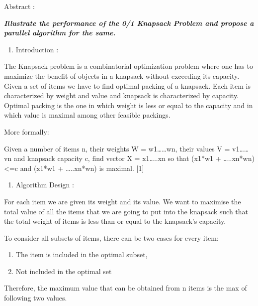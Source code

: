 \documentclass[letterpaper]{article}
\newcounter{saveenum}
\newcommand\liststyleWWNumiii{%
\renewcommand\theenumi{\Roman{enumi}}
\renewcommand\theenumii{\Alph{enumii}}
\renewcommand\theenumiii{\arabic{enumiii}}
\renewcommand\theenumiv{\alph{enumiv}}
\renewcommand\labelenumi{\theenumi.}
\renewcommand\labelenumii{\theenumii.}
\renewcommand\labelenumiii{\theenumiii.}
\renewcommand\labelenumiv{\theenumiv)}
}
\newcommand\liststyleWWNumi{%
\renewcommand\theenumi{\arabic{enumi}}
\renewcommand\theenumii{\alph{enumii}}
\renewcommand\theenumiii{\roman{enumiii}}
\renewcommand\theenumiv{\arabic{enumiv}}
\renewcommand\labelenumi{\theenumi.}
\renewcommand\labelenumii{\theenumii.}
\renewcommand\labelenumiii{\theenumiii.}
\renewcommand\labelenumiv{\theenumiv.}
}
\begin{document}
\begin{multicols}{2}
{\mdseries
Abstract :}

{\bfseries\itshape
Illustrate the performance of the 0/1 Knapsack Problem and propose a parallel algorithm for the same. }

\liststyleWWNumiii
\begin{enumerate}
\item Introduction :
\end{enumerate}
The Knapsack problem is a combinatorial optimization problem where one has to maximize the benefit of objects in a
knapsack without exceeding its capacity. Given a set of items we have to find optimal packing of a knapsack. Each item
is characterized by weight and value and knapsack is characterized by capacity. Optimal packing is the one in which
weight is less or equal to the capacity and in which value is maximal among other feasible packings. 

More formally: 

Given a number of items n, their weights W = w1{\dots}{\dots}wn, their values V = v1{\dots}{\dots}vn and knapsack
capacity c, find vector X = x1{\dots}..xn so that (x1*w1 + {\dots}..xn*wn) {\textless}=c and (x1*w1 + {\dots}..xn*wn)
is maximal. [1] 


\bigskip

\liststyleWWNumiii
\setcounter{saveenum}{\value{enumi}}
\begin{enumerate}
\setcounter{enumi}{\value{saveenum}}
\item Algorithm Design :
\end{enumerate}

\bigskip

For each item we are given its weight and its value. We want to maximise the total value of all the items that we are
going to put into the knapsack such that the total weight of items is less than or equal to the knapsack's capacity.

To consider all subsets of items, there can be two cases for every item: 

\liststyleWWNumi
\begin{enumerate}
\item The item is included in the optimal subset,
\item Not included in the optimal set
\end{enumerate}

\bigskip

Therefore, the maximum value that can be obtained from n items is the max of following two values.


\end{multicols}
\end{document}
